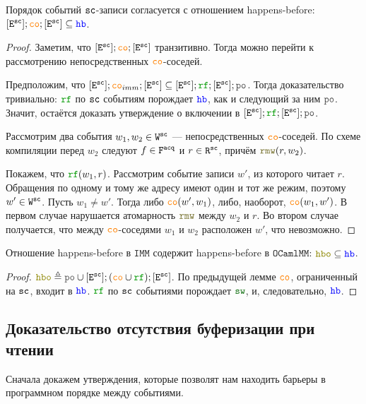 \documentclass[14pt]{matmex-diploma-custom}
\newcommand{\Wsc}{\lW^{\sco}}
\newcommand{\Rsc}{\lR^{\sco}}
\newcommand{\Fa}{\lF^{\acq}}
\newcommand{\IMM}{\mathtt{IMM}}
\newcommand{\OMM}{\mathtt{OCaml}\allowbreak \mathtt{MM}}
\begin{document}
\begin{lemma}
  \label{sc-co-hb}
  Порядок событий ${\mathtt{sc}}$-записи согласуется с отношением happens-before: $[\lE^{\sco}] ; \lCO ; [\lE^{\sco}] \subseteq \lHB$. 
\end{lemma}

\begin{proof}
  Заметим, что  $[\lE^{\sco}] ; \lCO ; [\lE^{\sco}]$ транзитивно. Тогда можно перейти к рассмотрению непосредственных $\lCO$-соседей. 

  Предположим, что $[\lE^{\sco}] ; \lCO_{imm} ; [\lE^{\sco}] \subseteq [\lE^{\sco}] ; \lRF ; [\lE^{\sco}] ; \lPO$. Тогда доказательство тривиально: $\lRF$ по ${\mathtt{sc}}$ событиям порождает $\lHB$, как и следующий за ним $\lPO$. Значит, остаётся доказать утверждение о включении в $[\lE^{\sco}] ; \lRF ; [\lE^{\sco}] ; \lPO$.

  Рассмотрим два события $w_1, w_2 \in \Wsc$ --- непосредственных $\lCO$-соседей. По схеме компиляции перед $w_2$ следуют $f\in \Fa$ и $r \in \Rsc$, причём $\lRMW(r, w_2)$.

  Покажем, что $\lRF(w_1, r)$. Рассмотрим событие записи $w'$, из которого читает $r$. Обращения по одному и тому же адресу имеют один и тот же режим, поэтому $w' \in {\mathtt{W}}^{\mathtt{sc}}$. 
  Пусть $w_1\neq w'$. Тогда либо $\lCO(w', w_1)$, либо, наоборот, $\lCO(w_1, w')$. В первом случае нарушается атомарность $\lRMW$ между $w_2$ и $r$. Во втором случае получается, что между $\lCO$-соседями $w_1$ и $w_2$ расположен $w'$, что невозможно. 
\end{proof}

\begin{lemma}
  \label{hbo-in-hb}
  Отношение happens-before в $\IMM$ содержит happens-before в $\OMM$: $\lHBO \subseteq \lHB$. 
\end{lemma}
\begin{proof}
  $\lHBO \defeq \lPO \cup [\lE^{\sco}] ; (\lCO \cup \lRF) ; [\lE^{\sco}]$. По предыдущей лемме $\lCO$, ограниченный на ${\mathtt{sc}}$, входит в $\lHB$. $\lRF$ по ${\mathtt{sc}}$ событиями порождает $\lSW$, и, следовательно, $\lHB$. 
\end{proof}

\subsection{Доказательство отсутствия буферизации при чтении}
\label{corr-causality}
Сначала докажем утверждения, которые позволят нам находить барьеры в программном порядке между событиями.
\end{document}
